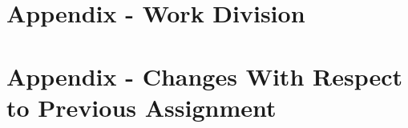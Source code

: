 \documentclass[runningheads]{llncs}
\begin{document}


















\newpage
\printbibliography


\appendix
\section{Appendix - Work Division}


\section{Appendix - Changes With Respect to Previous Assignment}
\end{document}
